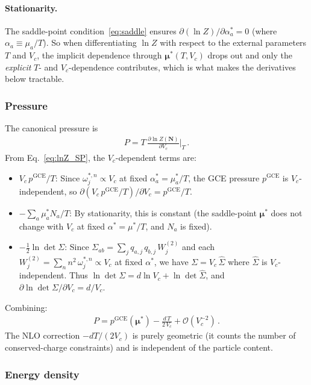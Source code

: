 \documentclass[11pt]{article}
\newcommand{\bmu}{\bm{\mu}}
\newcommand{\bN}{\mathbf{N}}
\newcommand{\GCE}{\mathrm{GCE}}
\begin{document}
\paragraph{Stationarity.}
The saddle-point condition~\eqref{eq:saddle} ensures $\partial(\ln Z)/\partial\alpha_a^* = 0$ (where $\alpha_a \equiv \mu_a/T$).
So when differentiating $\ln Z$ with respect to the external parameters $T$ and $V_c$, the implicit dependence through $\bmu^*(T, V_c)$ drops out and only the \emph{explicit} $T$- and $V_c$-dependence contributes, which is what makes the derivatives below tractable.

\subsubsection{Pressure}

The canonical pressure is
\begin{align}
  P = T\,\frac{\partial \ln Z(\bN)}{\partial V_c}\bigg|_T \,.
\end{align}
From Eq.~\eqref{eq:lnZ_SP}, the $V_c$-dependent terms are:
\begin{itemize}
  \item $V_c\,p^{\GCE}/T$: Since $\omega_j^{*,n} \propto V_c$ at fixed $\alpha_a^* = \mu_a^*/T$, the GCE pressure $p^{\GCE}$ is $V_c$-independent, so $\partial(V_c\,p^{\GCE}/T)/\partial V_c = p^{\GCE}/T$.
  \item $-\sum_a \mu_a^* N_a/T$: By stationarity, this is constant (the saddle-point $\bmu^*$ does not change with $V_c$ at fixed $\alpha^* = \mu^*/T$, and $N_a$ is fixed).
  \item $-\tfrac{1}{2}\ln\det\Sigma$: Since $\Sigma_{ab} = \sum_j q_{a,j}\,q_{b,j}\,W_j^{(2)}$ and each $W_j^{(2)} = \sum_n n^2\,\omega_j^{*,n} \propto V_c$ at fixed $\alpha^*$, we have $\Sigma = V_c\,\hat\Sigma$ where $\hat\Sigma$ is $V_c$-independent. Thus $\ln\det\Sigma = d\ln V_c + \ln\det\hat\Sigma$, and $\partial\ln\det\Sigma/\partial V_c = d/V_c$.
\end{itemize}
Combining:
\begin{align}
  P = p^{\GCE}(\bmu^*) - \frac{d\,T}{2\,V_c} + \mathcal{O}(V_c^{-2}) \,.
  \label{eq:pressure}
\end{align}
The NLO correction $-dT/(2V_c)$ is purely geometric (it counts the number of conserved-charge constraints) and is independent of the particle content.

\subsubsection{Energy density}
\end{document}
